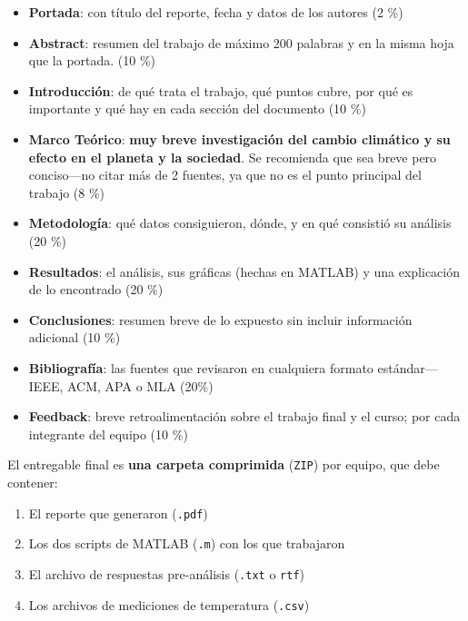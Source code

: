 \documentclass[]{article}
\theoremstyle{definition}
\newcommand{\markthis}[1]{{\color{blue}\textbf{#1}}}
\begin{document}
\begin{itemize}
    \item \textbf{Portada}: con título del reporte, fecha y datos de los autores (2 \%)
    \item \textbf{Abstract}: resumen del trabajo de máximo 200 palabras y en la misma hoja que la portada. (10 \%)
    \item \textbf{Introducción}: de qué trata el trabajo, qué puntos cubre, por qué es importante y qué hay en cada sección del documento (10 \%)
    \item \textbf{Marco Teórico}: \markthis{muy breve investigación del cambio climático y su efecto en el planeta y la sociedad}. Se recomienda que sea breve pero conciso---no citar más de 2 fuentes, ya que no es el punto principal del trabajo (8 \%)
    \item \textbf{Metodología}: qué datos consiguieron, dónde, y en qué consistió su análisis (20 \%)
    \item \textbf{Resultados}: el análisis, sus gráficas (hechas en MATLAB) y una explicación de lo encontrado (20 \%)
    \item \textbf{Conclusiones}: resumen breve de lo expuesto sin incluir información adicional (10 \%)
    \item \textbf{Bibliografía}: las fuentes que revisaron en cualquiera formato estándar---IEEE, ACM, APA o MLA (20\%)
    \item \textbf{Feedback}: breve retroalimentación sobre el trabajo final y el curso; por cada integrante del equipo (10 \%)
\end{itemize}

\vspace{2 cm}

El entregable final es \textbf{una carpeta comprimida} (\texttt{ZIP}) por equipo, que debe contener:

\begin{enumerate}
    \item El reporte que generaron (\texttt{.pdf})
    \item Los dos scripts de MATLAB (\texttt{.m}) con los que trabajaron
    \item El archivo de respuestas pre-análisis (\texttt{.txt} o \texttt{rtf})
    \item Los archivos de mediciones de temperatura (\texttt{.csv})
\end{enumerate}
\end{document}
